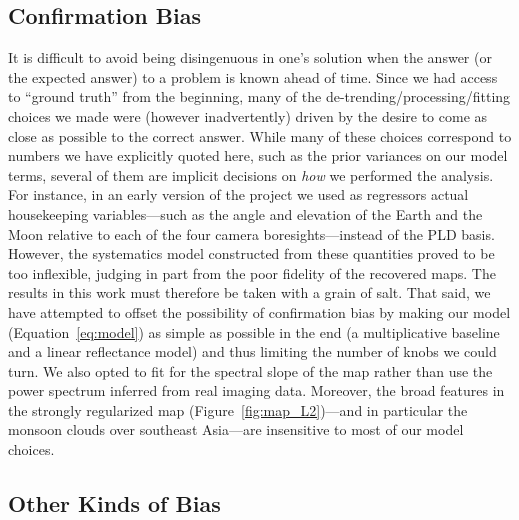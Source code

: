\documentclass[modern]{aastex62}
\begin{document}
\subsection{Confirmation Bias}
\label{sec:confirmation}

It is difficult to avoid being disingenuous in one's solution
when the answer (or the expected answer)
to a problem is known ahead of time. Since we had access to 
``ground truth'' from the beginning, many of the de-trending/processing/fitting
choices we made were (however inadvertently) driven by the desire to
come as close as possible to the correct answer. While many of these choices
correspond to numbers we have explicitly quoted here, such as the prior
variances on our model terms, several of them are implicit decisions on
\emph{how} we performed the analysis. For instance, in an early version of 
the project we used as regressors actual \TESS housekeeping variables---such as the angle 
and elevation of the Earth and the Moon relative to each of the four camera 
boresights---instead of the PLD basis. However, the systematics model constructed from these quantities
proved to be too inflexible, judging in part from the poor fidelity of the recovered
maps. The results in this work
must therefore be taken with a grain of salt. That said, we have attempted to
offset the possibility of confirmation bias by making our model
(Equation~\ref{eq:model}) as simple as possible in the end (a multiplicative baseline
and a linear reflectance model) and thus limiting
the number of knobs we could turn. We also opted to fit for the spectral
slope of the map rather than use the power spectrum inferred from 
real imaging data. Moreover, the broad features in the strongly
regularized map (Figure~\ref{fig:map_L2})---and in particular the monsoon clouds
over southeast Asia---are insensitive to most of our model choices.

\subsection{Other Kinds of Bias}
\label{sec:bias}
\end{document}
